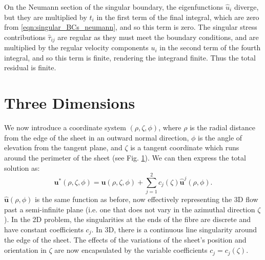 \documentclass[12pt,a4paper]{article}
\numberwithin{equation}{section}
\begin{document}
On the Neumann section of the singular boundary, the eigenfunctions $\hat u_i$ diverge, but they are multiplied by $t_i$ in the first term of the final integral, which are zero from \eqref{eqn:singular_BCs_neumann}, and so this term is zero. The singular stress contributions $\hat \tau_{ij}$ are regular as they must meet the boundary conditions, and are multiplied by the regular velocity components $u_i$ in the second term of the fourth integral, and so this term is finite, rendering the integrand finite. Thus the total residual is finite.


\section{Three Dimensions}

We now introduce a coordinate system $(\rho,\zeta,\phi)$, where $\rho$ is the radial distance from the edge of the sheet in an outward normal direction, $\phi$ is the angle of elevation from the tangent plane, and $\zeta$ is a tangent coordinate which runs around the perimeter of the sheet (see Fig. \ref{}). We can then express the total solution as:
\begin{equation}
  \bm u^*(\rho,\zeta,\phi) = \bm u(\rho,\zeta,\phi) + \sum_{j=1}^2 c_j(\zeta)\hat{\bm u}^j(\rho,\phi).
\end{equation}
$\hat{\bm u}(\rho,\phi)$ is the same function as before, now effectively representing the 3D flow past a semi-infinite plane (i.e. one that does not vary in the azimuthal direction $\zeta$). In the 2D problem, the singularities at the ends of the fibre are discrete and have constant coefficients $c_j$. In 3D, there is a continuous line singularity around the edge of the sheet. The effects of the variations of the sheet's position and orientation in $\zeta$ are now encapsulated by the variable coefficients $c_j = c_j(\zeta)$.
\end{document}
